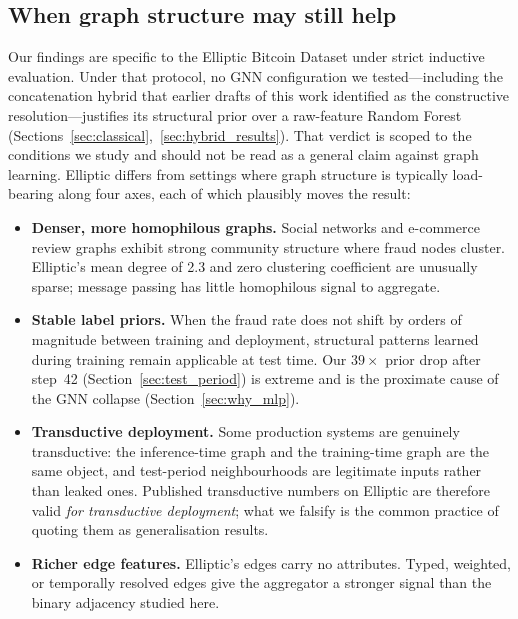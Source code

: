 \subsection{When graph structure may still help}
\label{sec:when_graph_helps}

Our findings are specific to the Elliptic Bitcoin Dataset under
strict inductive evaluation.  Under that protocol, no GNN
configuration we tested---including the concatenation hybrid that
earlier drafts of this work identified as the constructive
resolution---justifies its structural prior over a raw-feature
Random Forest
(Sections~\ref{sec:classical},~\ref{sec:hybrid_results}).  That
verdict is scoped to the conditions we study and should not be
read as a general claim against graph learning.  Elliptic differs
from settings where graph structure is typically load-bearing
along four axes, each of which plausibly moves the result:

\begin{itemize}[leftmargin=*,itemsep=2pt,parsep=0pt]
  \item \textbf{Denser, more homophilous graphs.}  Social networks
    and e-commerce review graphs exhibit strong community structure
    where fraud nodes cluster.  Elliptic's mean degree of 2.3 and
    zero clustering coefficient are unusually sparse; message
    passing has little homophilous signal to aggregate.

  \item \textbf{Stable label priors.}  When the fraud rate does not
    shift by orders of magnitude between training and deployment,
    structural patterns learned during training remain applicable
    at test time.  Our $39\times$ prior drop after step~42
    (Section~\ref{sec:test_period}) is extreme and is the
    proximate cause of the GNN collapse
    (Section~\ref{sec:why_mlp}).

  \item \textbf{Transductive deployment.}  Some production systems
    are genuinely transductive: the inference-time graph and the
    training-time graph are the same object, and test-period
    neighbourhoods are legitimate inputs rather than leaked ones.
    Published transductive numbers on Elliptic are therefore valid
    \emph{for transductive deployment}; what we falsify is the
    common practice of quoting them as generalisation results.

  \item \textbf{Richer edge features.}  Elliptic's edges carry no
    attributes.  Typed, weighted, or temporally resolved edges
    give the aggregator a stronger signal than the binary
    adjacency studied here.
\end{itemize}

